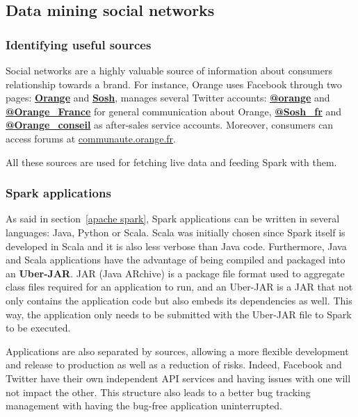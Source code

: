 \documentclass[11pt]{article}
\begin{document}
\subsection{Data mining social networks}

\subsubsection{Identifying useful sources}

Social networks are a highly valuable source of information about consumers relationship towards a brand. For instance, Orange uses Facebook through two pages: \href{https://www.facebook.com/Orange.France/?ref=ts}{\textbf{Orange}} and \href{https://www.facebook.com/sosh/?fref=ts}{\textbf{Sosh}}, manages several Twitter accounts: \href{https://twitter.com/orange}{\textbf{@orange}} and \href{https://twitter.com/Orange_France}{\textbf{@Orange\_France}} for general communication about Orange, \href{https://twitter.com/Sosh_fr}{\textbf{@Sosh\_fr}} and \href{https://twitter.com/Orange_conseil}{\textbf{@Orange\_conseil}} as after-sales service accounts. Moreover, consumers can access forums at \href{https://communaute.orange.fr}{\url{communaute.orange.fr}}.

All these sources are used for fetching live data and feeding Spark with them.

\subsubsection{Spark applications}

As said in section~\ref{apache spark}, Spark applications can be written in several languages: Java, Python or Scala. Scala was initially chosen since Spark itself is developed in Scala and it is also less verbose than Java code. Furthermore, Java and Scala applications have the advantage of being compiled and packaged into an \textbf{Uber-JAR}. JAR (Java ARchive) is a package file format used to aggregate class files required for an application to run, and an Uber-JAR is a JAR that not only contains the application code but also embeds its dependencies as well. This way, the application only needs to be submitted with the Uber-JAR file to Spark to be executed.

Applications are also separated by sources, allowing a more flexible development and release to production as well as a reduction of risks. Indeed, Facebook and Twitter have their own independent API services and having issues with one will not impact the other. This structure also leads to a better bug tracking management with having the bug-free application uninterrupted.
\end{document}
